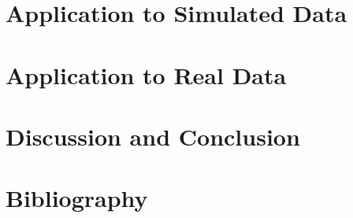 \documentclass[12pt]{article}
\begin{document}
\section{Application to Simulated Data}


\section{Application to Real Data}


%

\section{Discussion and Conclusion}


\section{Bibliography}
\end{document}
